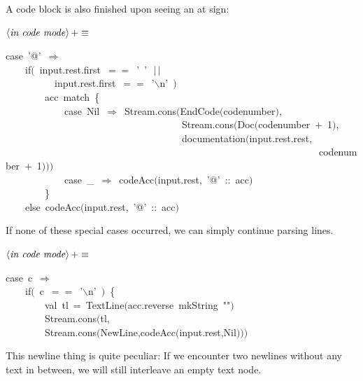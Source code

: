 \documentclass[a4paper,12pt]{article}
\begin{document}
A code block is also finished upon seeing an at sign:

$\left<\mbox{\emph{in code mode}}\right>+\equiv$
\begin{program}{\vem case}~'@'~$\Rightarrow$
\\~~~~{\vem if}$($~input.rest.first~$==$~'~'~$\,|$$\,|$
\\~~~~~~~~~~input.rest.first~$==$~'$\backslash$n'~$)$
\\~~~~~~~~acc~{\vem match}~{\small\{}
\\~~~~~~~~~~~~{\vem case}~Nil~$\Rightarrow$~Stream.cons$($EndCode$($codenumber$)$,
\\~~~~~~~~~~~~~~~~~~~~~~~~~~~~~~~~~~~~Stream.cons$($Doc$($codenumber~$+$~1$)$,
\\~~~~~~~~~~~~~~~~~~~~~~~~~~~~~~~~~~~~documentation$($input.rest.rest,
\\~~~~~~~~~~~~~~~~~~~~~~~~~~~~~~~~~~~~~~~~~~~~~~~~~~~~~~~~~~~~~~~~codenumber~$+$~1$)$$)$$)$
\\~~~~~~~~~~~~{\vem case}~\_~$\Rightarrow$~codeAcc$($input.rest,~'@'~{\rm :}{\rm :}~acc$)$
\\~~~~~~~~{\small\}}
\\~~~~{\vem else}~codeAcc$($input.rest,~'@'~{\rm :}{\rm :}~acc$)$
\\[0.5em]\end{program}
If none of these special cases occurred, we can simply continue parsing
lines.

$\left<\mbox{\emph{in code mode}}\right>+\equiv$
\begin{program}{\vem case}~c~$\Rightarrow$
\\~~~~{\vem if}$($~c~$==$~'$\backslash$n'~$)$~{\small\{}
\\~~~~~~~~{\vem val}~tl~=~TextLine$($acc.reverse~mkString~""$)$
\\~~~~~~~~Stream.cons$($tl,
\\~~~~~~~~Stream.cons$($NewLine,codeAcc$($input.rest,Nil$)$$)$$)$
\\[0.5em]\end{program}
This newline thing is quite peculiar: If we encounter two newlines
without any text in between, we will still interleave an empty text node.
\end{document}
